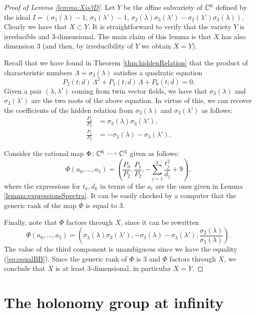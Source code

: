 \documentclass[phd,tocprelim]{cornell}
\begin{document}
\begin{proof}[Proof of Lemma \ref*{lemma:Xis3D}]
 Let $Y$ be the affine subvariety of $\mathbb{C}^6$ defined by the ideal $I=( \sigma_1(\lambda)-1,\, \sigma_1(\lambda')-1,\,  \sigma_2(\lambda)\sigma_3(\lambda')-\sigma_2(\lambda')\sigma_3(\lambda) )$. Clearly we have that $X\subset Y$. It is straightforward to verify that the variety $Y$ is irreducible and 3-dimensional. The main claim of this lemma is that $X$ has also dimension 3 (and then, by irreducibility of $Y$ we obtain $X=Y$).
 
 Recall that we have found in Theorem \ref{thm:hiddenRelation} that the product of characteristic numbers $\Lambda=\sigma_3(\lambda)$ satisfies a quadratic equation
  \[ P_2(t;d)\,\Lambda^2+P_1(t;d)\,\Lambda+P_0(t;d)=0 . \]
 Given a pair $(\lambda,\lambda')$ coming from twin vector fields, we have that $\sigma_3(\lambda)$ and $\sigma_3(\lambda')$ are the two roots of the above equation. In virtue of this, we can recover the coefficients of the hidden relation from $\sigma_3(\lambda)$ and $\sigma_3(\lambda')$ as follows:
 \begin{align*}
  \frac{P_0}{P_2} &= \sigma_3(\lambda)\sigma_3(\lambda'), \\
  \frac{P_1}{P_2} &= -\sigma_3(\lambda)-\sigma_3(\lambda').
 \end{align*}

 Consider the rational map $\Phi\colon\C^6\dashedArrow\C^3$ given as follows: 
  \[ \Phi(a_0,\ldots,a_5)=\left( \frac{P_0}{P_2}, \frac{P_1}{P_2}, -\sum_{j=1}^4\frac{t_j^2}{d_j} +9 \right), \]
 where the expressions for $t_k,d_k$ in terms of the $a_i$ are the ones given in Lemma \ref{lemma:expressionsSpectra}. It can be easily checked by a computer that the generic rank of the map $\Phi$ is equal to 3.
 
 Finally, note that $\Phi$ factors through $X$, since it can be rewritten
  \[ \Phi(a_0,\ldots,a_5)=\left( \sigma_3(\lambda)\sigma_3(\lambda'), -\sigma_3(\lambda)-\sigma_3(\lambda'), \frac{\sigma_2(\lambda)}{\sigma_3(\lambda)} \right). \]
 The value of the third component is unambiguous since we have the equality (\ref{eq:equalBB}). Since the generic rank of $\Phi$ is 3 and $\Phi$ factors through $X$, we conclude that $X$ is at least 3-dimensional, in particular $X=Y$.  
\end{proof}



\chapter{The holonomy group at infinity}\label{chpt:holonomy}
% 


\nocite{StrongTopoInvariance,UtmostRigidity,TwinVectorFields,WoodsHole,NoIndexTheorems}

\end{document}
